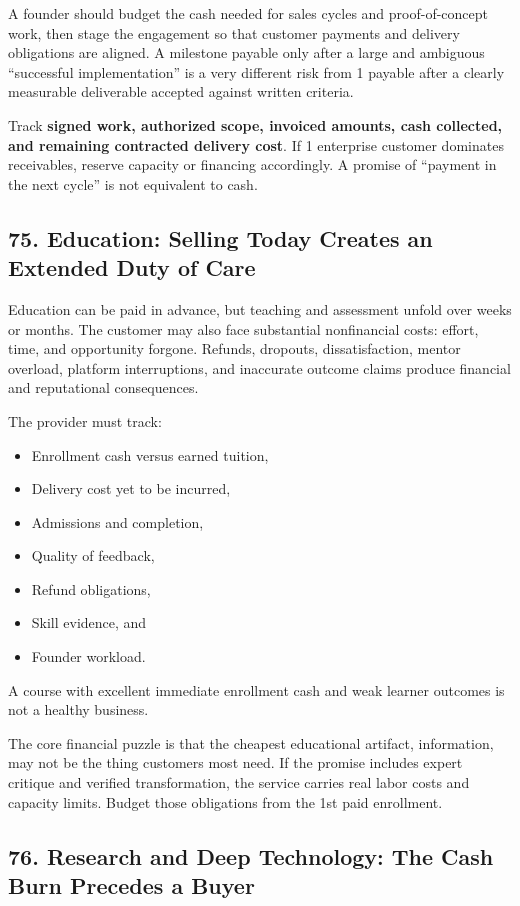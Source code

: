 A founder should budget the cash needed for sales cycles and proof-of-concept work, then stage the engagement so that customer payments and delivery obligations are aligned. A milestone payable only after a large and ambiguous ``successful implementation'' is a very different risk from 1 payable after a clearly measurable deliverable accepted against written criteria.

Track \textbf{signed work, authorized scope, invoiced amounts, cash collected, and remaining contracted delivery cost}. If 1 enterprise customer dominates receivables, reserve capacity or financing accordingly. A promise of ``payment in the next cycle'' is not equivalent to cash.

\subsection*{75. Education: Selling Today Creates an Extended Duty of Care}

Education can be paid in advance, but teaching and assessment unfold over weeks or months. The customer may also face substantial nonfinancial costs: effort, time, and opportunity forgone. Refunds, dropouts, dissatisfaction, mentor overload, platform interruptions, and inaccurate outcome claims produce financial and reputational consequences.

The provider must track:
\begin{itemize}
\item Enrollment cash versus earned tuition,
\item Delivery cost yet to be incurred,
\item Admissions and completion,
\item Quality of feedback,
\item Refund obligations,
\item Skill evidence, and
\item Founder workload.
\end{itemize}
A course with excellent immediate enrollment cash and weak learner outcomes is not a healthy business.

The core financial puzzle is that the cheapest educational artifact, information, may not be the thing customers most need. If the promise includes expert critique and verified transformation, the service carries real labor costs and capacity limits. Budget those obligations from the 1st paid enrollment.

\subsection*{76. Research and Deep Technology: The Cash Burn Precedes a Buyer}


